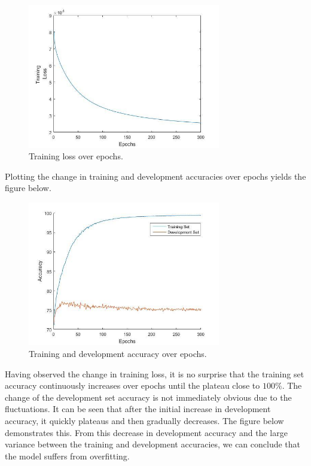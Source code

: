 \documentclass{article} %
\begin{document}
\begin{figure}[H]
\centering
\includegraphics[width=0.75\textwidth]{graphics/tloss.jpg}
\caption{Training loss over epochs.}
\end{figure}

Plotting the change in training and development accuracies over epochs yields the figure below.

\begin{figure}[H]
\centering
\includegraphics[width=0.75\textwidth]{graphics/tdloss.jpg}
\caption{Training and development accuracy over epochs.}
\end{figure}

Having observed the change in training loss, it is no surprise that the training set accuracy continuously increases over epochs until the plateau close to $100\%$. The change of the development set accuracy is not immediately obvious due to the fluctuations. It can be seen that after the initial increase in development accuracy, it quickly plateaus and then gradually decreases. The figure below demonstrates this. From this decrease in development accuracy and the large variance between the training and development accuracies, we can conclude that the model suffers from overfitting.
\end{document}
